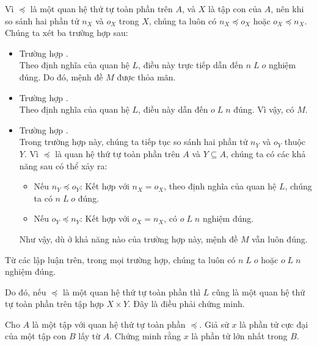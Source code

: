 Vì $\preccurlyeq$ là một quan hệ thứ tự toàn phần trên $A$, và $X$ là tập con của $A$, nên khi so sánh hai phần tử $n_X$ và $o_X$ trong $X$, chúng ta luôn có $n_X \preccurlyeq o_X$ hoặc $o_X \preccurlyeq n_X$. Chúng ta xét ba trường hợp sau:

\begin{itemize}
   \item Trường hợp . \\
   Theo định nghĩa của quan hệ $L$, điều này trực tiếp dẫn đến $n\;L\;o$ nghiệm đúng. Do đó, mệnh đề $M$ được thỏa mãn.

   \item Trường hợp . \\
   Theo định nghĩa của quan hệ $L$, điều này dẫn đến $o\;L\;n$ đúng. Vì vậy, có $M$.

   \item Trường hợp . \\
   Trong trường hợp này, chúng ta tiếp tục so sánh hai phần tử $n_Y$ và $o_Y$ thuộc $Y$. Vì $\preccurlyeq$ là quan hệ thứ tự toàn phần trên $A$ và $Y \subseteq A$, chúng ta có các khả năng sau có thể xảy ra:
   \begin{itemize}
      \item Nếu $n_Y \preccurlyeq o_Y$: Kết hợp với $n_X = o_X$, theo định nghĩa của quan hệ $L$, chúng ta có $n\;L\;o$ đúng.
      \item Nếu $o_Y \preccurlyeq n_Y$: Kết hợp với $o_X = n_X$, có $o\;L\;n$ nghiệm đúng.
   \end{itemize}
   Như vậy, dù ở khả năng nào của trường hợp này, mệnh đề $M$ vẫn luôn đúng.
\end{itemize}

Từ các lập luận trên, trong mọi trường hợp, chúng ta luôn có $n\;L\;o$ hoặc $o\;L\;n$ nghiệm đúng. 

Do đó, nếu $\preccurlyeq$ là một quan hệ thứ tự toàn phần thì $L$ cũng là một quan hệ thứ tự toàn phần trên tập hợp $X \times Y$. Đây là điều phải chứng minh.

\exercise Cho $A$ là một tập với quan hệ thứ tự toàn phần $\preccurlyeq$. Giả sử $x$ là phần tử cực đại của một tập con $B$ lấy từ $A$. Chứng minh rằng $x$ là phần tử lớn nhất trong $B$.

\solution 

